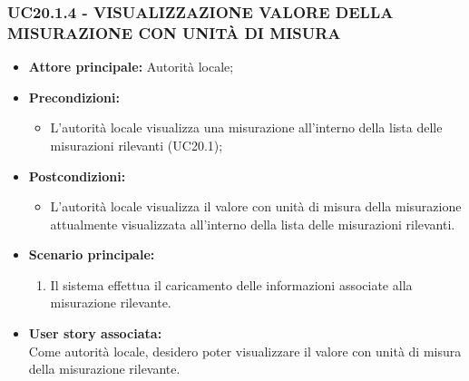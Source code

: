 \subsubsection{UC20.1.4 - VISUALIZZAZIONE VALORE DELLA MISURAZIONE CON UNITÀ DI MISURA}
\begin{itemize}
    \item \textbf{Attore principale:} Autorità locale;
    \item \textbf{Precondizioni:}
        \begin{itemize}
                \item L'autorità locale visualizza una misurazione all'interno della lista delle misurazioni rilevanti (UC20.1);
        \end{itemize}
    \item \textbf{Postcondizioni:}
        \begin{itemize}
            \item L'autorità locale visualizza il valore con unità di misura della misurazione attualmente visualizzata all'interno della lista delle misurazioni rilevanti.
        \end{itemize}
    \item \textbf{Scenario principale:}
        \begin{enumerate}
            \item Il sistema effettua il caricamento delle informazioni associate alla misurazione rilevante.
        \end{enumerate}
    \item \textbf{User story associata:} \\
    Come autorità locale, desidero poter visualizzare il valore con unità di misura della misurazione rilevante.
\end{itemize}